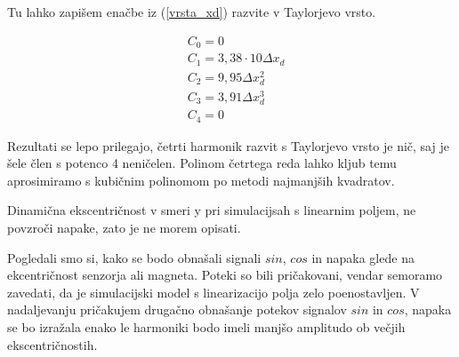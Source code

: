 Tu lahko zapišem enačbe iz (\ref{vrsta_xd}) razvite v Taylorjevo vrsto.


\begin{eqnarray}
&C_0 =0\\
&C_1 =3,38\cdot 10\Delta x_d\\     
&C_2 =9,95\Delta x_d^{2}\\             
&C_3 =3,91\Delta x_d^{3}\\         
&C_4 =0            
\end{eqnarray}

Rezultati se lepo prilegajo, četrti harmonik razvit s Taylorjevo vrsto je nič, saj je šele člen s potenco 4 neničelen. Polinom četrtega reda lahko kljub temu aprosimiramo s kubičnim polinomom po metodi najmanjših kvadratov.

Dinamična ekscentričnost v smeri y pri simulacijsah s linearnim poljem, ne povzroči napake, zato je ne morem opisati.

Pogledali smo si, kako se bodo obnašali signali $sin$, $cos$ in napaka glede na ekcentričnost senzorja ali magneta. Poteki so bili pričakovani, vendar semoramo zavedati, da je simulacijski model s linearizacijo polja zelo poenostavljen. V nadaljevanju pričakujem drugačno obnašanje potekov signalov $sin$ in $cos$, napaka se bo izražala enako le harmoniki bodo imeli manjšo amplitudo ob večjih ekscentričnostih.


%
%
%
%

